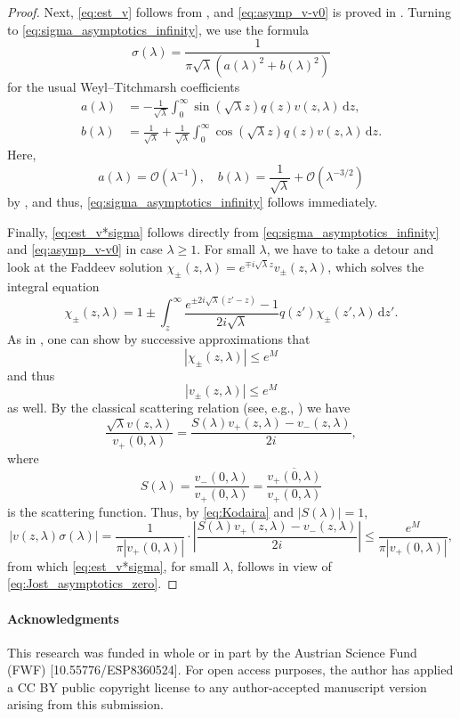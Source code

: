 \documentclass[11pt,twoside,reqno,centertags]{amsart}
\theoremstyle{definition}
\newcommand{\dd}{\mathrm d}
\begin{document}
\begin{proof}
	Next, \eqref{eq:est_v} follows from \cite[Lem. 3.1.4]{Marchenko11}, and \eqref{eq:asymp_v-v0} is proved in \cite[Lem. 2]{Eastham97}. Turning to \eqref{eq:sigma_asymptotics_infinity}, we use the formula \cite{Titchmarsh46}
	\[\sigma(\lambda) = \frac{1}{\pi\sqrt\lambda(a(\lambda)^2+b(\lambda)^2)}\]
	for the usual Weyl--Titchmarsh coefficients
	\begin{align*}
		a(\lambda) &= -\frac{1}{\sqrt\lambda} \int_0^\infty \sin(\sqrt\lambda z) q(z) v(z,\lambda)\,\dd z,\\ b(\lambda) &= \frac{1}{\sqrt\lambda} + \frac{1}{\sqrt\lambda} \int_0^\infty \cos(\sqrt\lambda z) q(z) v(z,\lambda)\,\dd z.
	\end{align*}
	Here,
	\[a(\lambda) = \mathcal O(\lambda^{-1}),\quad b(\lambda) = \frac{1}{\sqrt\lambda} + \mathcal O(\lambda^{-3/2})\]
	by \cite[Lem. 3]{Eastham97}, and thus, \eqref{eq:sigma_asymptotics_infinity} follows immediately.
	
	Finally, \eqref{eq:est_v*sigma} follows directly from \eqref{eq:sigma_asymptotics_infinity} and \eqref{eq:asymp_v-v0} in case $\lambda\ge1$. For small $\lambda$, we have to take a detour and look at the Faddeev solution $\chi_\pm(z,\lambda)=e^{\mp i\sqrt\lambda z}v_\pm(z,\lambda)$, which solves the integral equation
	\[\chi_\pm(z,\lambda)=1\pm\int_z^\infty\frac{e^{\pm 2i\sqrt\lambda(z'-z)}-1}{2i\sqrt\lambda}q(z')\chi_\pm(z',\lambda)\,\dd z'.\]
	As in \cite[Pf. of Thm. 8.2.1]{BennewitzBrownWeikard20}, one can show by successive approximations that
	\[|\chi_\pm(z,\lambda)|\le e^M\]
	and thus
	\[|v_\pm(z,\lambda)|\le e^M\]
	as well. By the classical scattering relation (see, e.g., \cite[Lem. 3.1.5]{Marchenko11}) we have
	\[\frac{\sqrt\lambda v(z,\lambda)}{v_+(0,\lambda)}=\frac{S(\lambda)v_+(z,\lambda)-v_-(z,\lambda)}{2i},\]
	where
	\[S(\lambda) = \frac{v_-(0,\lambda)}{v_+(0,\lambda)} = \frac{\overline{v_+(0,\lambda)}}{v_+(0,\lambda)}\]
	is the scattering function. Thus, by \eqref{eq:Kodaira} and $|S(\lambda)|=1$,
	\[|v(z,\lambda)\sigma(\lambda)|=\frac{1}{\pi|v_+(0,\lambda)|}\cdot\left|\frac{S(\lambda)v_+(z,\lambda)-v_-(z,\lambda)}{2i}\right|\le\frac{e^M}{\pi|v_+(0,\lambda)|},\]
	from which \eqref{eq:est_v*sigma}, for small $\lambda$, follows in view of \eqref{eq:Jost_asymptotics_zero}.
\end{proof}

\paragraph{Acknowledgments}
This research was funded in whole or in part by the Austrian Science Fund (FWF) [10.55776/ESP8360524]. For open access purposes, the author has applied a CC BY public copyright license to any author-accepted manuscript version arising from this submission.

	

\end{document}
